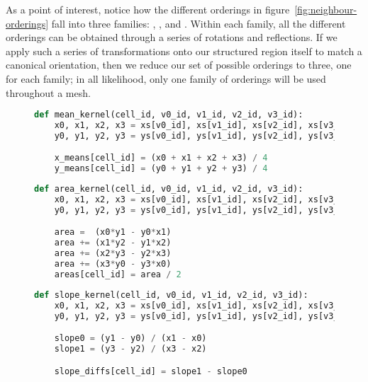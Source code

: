 As a point of interest, notice how the different orderings in figure~\ref{fig:neighbour-orderings} fall into three families: \cfamily{}, \xfamily{}, and \zfamily{}. Within each family, all the different orderings can be obtained through a series of rotations and reflections. If we apply such a series of transformations onto our structured region itself to match a canonical orientation, then we reduce our set of possible orderings to three, one for each family; in all likelihood, only one family of orderings will be used throughout a mesh.


\begin{figure}
\newsavebox{\meankernel}
\begin{lrbox}{\meankernel}
\begin{lstlisting}[language=python]
def mean_kernel(cell_id, v0_id, v1_id, v2_id, v3_id):
	x0, x1, x2, x3 = xs[v0_id], xs[v1_id], xs[v2_id], xs[v3_id]
	y0, y1, y2, y3 = ys[v0_id], ys[v1_id], ys[v2_id], ys[v3_id]

	x_means[cell_id] = (x0 + x1 + x2 + x3) / 4
	y_means[cell_id] = (y0 + y1 + y2 + y3) / 4
\end{lstlisting}
\end{lrbox}

\newsavebox{\areakernel}
\begin{lrbox}{\areakernel}
\begin{lstlisting}[language=python]
def area_kernel(cell_id, v0_id, v1_id, v2_id, v3_id):
	x0, x1, x2, x3 = xs[v0_id], xs[v1_id], xs[v2_id], xs[v3_id]
	y0, y1, y2, y3 = ys[v0_id], ys[v1_id], ys[v2_id], ys[v3_id]

	area =  (x0*y1 - y0*x1)
	area += (x1*y2 - y1*x2)
	area += (x2*y3 - y2*x3)
	area += (x3*y0 - y3*x0)
	areas[cell_id] = area / 2
\end{lstlisting}
\end{lrbox}

\newsavebox{\slopekernel}
\begin{lrbox}{\slopekernel}
\begin{lstlisting}[language=python]
def slope_kernel(cell_id, v0_id, v1_id, v2_id, v3_id):
	x0, x1, x2, x3 = xs[v0_id], xs[v1_id], xs[v2_id], xs[v3_id]
	y0, y1, y2, y3 = ys[v0_id], ys[v1_id], ys[v2_id], ys[v3_id]

	slope0 = (y1 - y0) / (x1 - x0)
	slope1 = (y3 - y2) / (x3 - x2)

	slope_diffs[cell_id] = slope1 - slope0
\end{lstlisting}
\end{lrbox}



\end{figure}
